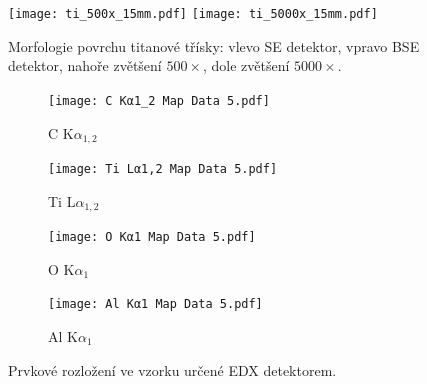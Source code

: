 \documentclass[a4paper,12pt]{article}
\begin{document}
\begin{figure}[h!]
	\centering
	\texttt{[image: ti\_500x\_15mm.pdf]}
	\texttt{[image: ti\_5000x\_15mm.pdf]}
	\caption{\centering Morfologie povrchu titanové třísky: vlevo SE detektor, 
	vpravo BSE 
	detektor, nahoře zvětšení $500\times$, dole zvětšení $5000\times$.}
	\label{fig:ti5000}
\end{figure}



\begin{figure}[h!]
	\centering
	\begin{subfigure}{0.49\textwidth}
		\texttt{[image: C Kα1\_2 Map Data 5.pdf]}
		\caption{\centering C K$\alpha_{1,2}$}
		\label{fig:EDX_C}
	\end{subfigure}
	\begin{subfigure}{0.49\textwidth}
		\texttt{[image: Ti Lα1,2 Map Data 5.pdf]}
		\caption{\centering Ti L$\alpha_{1,2}$}
		\label{fig:EDX_Ti}
	\end{subfigure}
	\begin{subfigure}{0.49\textwidth}
		\texttt{[image: O Kα1 Map Data 5.pdf]}
		\caption{\centering O K$\alpha_{1}$}
		\label{fig:EDX_O}
	\end{subfigure}
	\begin{subfigure}{0.49\textwidth}
		\texttt{[image: Al Kα1 Map Data 5.pdf]}
		\caption{\centering Al K$\alpha_{1}$}
		\label{fig:EDX_Al}
	\end{subfigure}
	
	\caption{Prvkové rozložení ve vzorku určené EDX detektorem.}
	\label{fig:EDX}
\end{figure}
\end{document}
